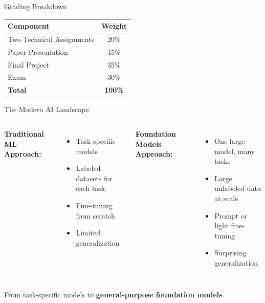 \documentclass[aspectratio=169,10pt]{beamer}
\begin{document}
\begin{frame}{Grading Breakdown}
  \begin{center}
    \Large
    \begin{tabular}{lc}
      \toprule
      \textbf{Component} & \textbf{Weight} \\
      \midrule
      Two Technical Assignments & 20\% \\
      Paper Presentation & 15\% \\
      Final Project & 35\% \\
      Exam & 30\% \\
      \bottomrule
      \textbf{Total} & \textbf{100\%} \\
      \bottomrule
    \end{tabular}
  \end{center}
\end{frame}


\begin{frame}{The Modern AI Landscape}
  \begin{columns}[T]
      \textbf{Traditional ML Approach:}
      \begin{itemize}
        \item Task-specific models
        \item Labeled datasets for each task
        \item Fine-tuning from scratch
        \item Limited generalization
      \end{itemize}

      \textbf{Foundation Models Approach:}
      \begin{itemize}
        \item One large model, many tasks
        \item Large unlabeled data at scale
        \item Prompt or light fine-tuning
        \item Surprising generalization
      \end{itemize}
  \end{columns}

  \vspace{0.4cm}

  \begin{tcolorbox}[hitbox, title=The Paradigm Shift]
    From task-specific models to \textbf{general-purpose foundation models}.
  \end{tcolorbox}
\end{frame}
\end{document}
